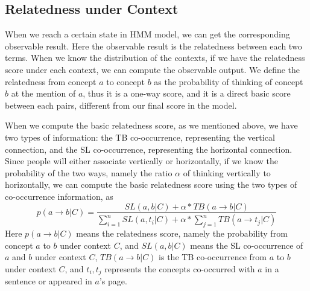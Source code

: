 \subsection{Relatedness under Context}
When we reach a certain state in HMM model, we can get the corresponding observable
result. Here the observable result is the relatedness between each two terms.
When we know the distribution of the contexts, if we have the relatedness score
under each context, we can compute the observable output.
We define the relatedness from concept $a$ to concept $b$ as the
probability of thinking of concept $b$ at the mention of $a$, thus
it is a one-way score, and it is a direct basic score between each pairs,
different from our final score in the model.

When we compute the basic relatedness score, as we mentioned above,
we have two types of information: the TB co-occurrence, representing
the vertical connection, and the SL co-occurrence, representing
the horizontal connection. Since people will either associate vertically or
horizontally, if we know the probability of the two ways, namely the ratio
$\alpha$ of thinking vertically to horizontally, we can compute the basic
relatedness score using the two types of co-occurrence information, as
\begin{equation}
p(a\rightarrow b|C)=\frac{SL(a,b|C)+\alpha *TB(a\rightarrow b|C)}{\sum_{i=1}^nSL(a,t_i|C)+\alpha *\sum_{j=1}^nTB(a\rightarrow t_j|C)}
\end{equation}
Here $p(a\rightarrow b|C)$ means the relatedness score, namely the probability
from concept $a$ to $b$ under context $C$, and $SL(a,b|C)$ means the
SL co-occurrence of $a$ and $b$ under context $C$,
$TB(a\rightarrow b|C)$ is the TB co-occurrence from
$a$ to $b$ under context $C$, and $t_i,t_j$ represents the concepts
co-occurred with $a$ in a sentence or appeared in $a$'s page.

